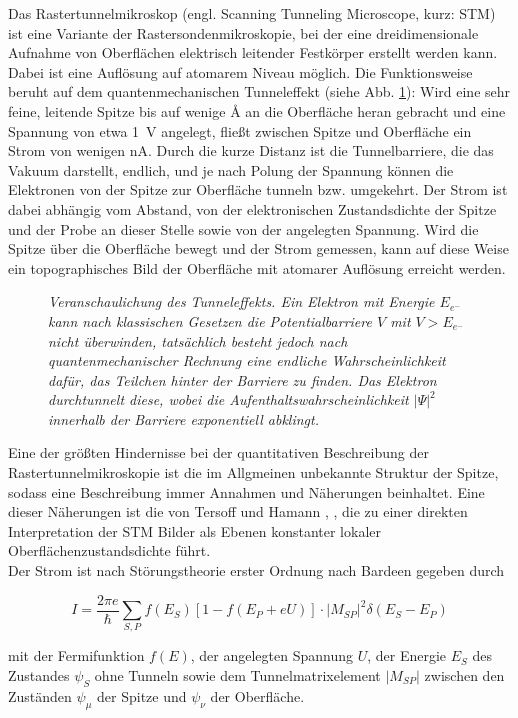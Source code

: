 Das Rastertunnelmikroskop (engl. Scanning Tunneling Microscope, kurz: STM) ist eine Variante der
Rastersondenmikroskopie, bei der eine dreidimensionale Aufnahme von Oberflächen elektrisch
leitender Festkörper erstellt werden kann. Dabei ist eine Auflösung auf atomarem Niveau möglich. Die
Funktionsweise beruht auf dem quantenmechanischen Tunneleffekt (siehe Abb. \ref{tunnel}): Wird eine
sehr feine, leitende Spitze bis auf wenige {\AA} an die Oberfläche heran gebracht und eine Spannung
von etwa \SI{1}{V} angelegt, fließt zwischen Spitze und Oberfläche ein Strom von wenigen nA. Durch
die kurze Distanz ist die Tunnelbarriere, die das Vakuum darstellt, endlich, und je nach Polung der Spannung können
die Elektronen von der Spitze zur Oberfläche tunneln bzw.
umgekehrt. Der Strom ist dabei abhängig vom Abstand, von der elektronischen Zustandsdichte der
Spitze und der Probe an dieser Stelle sowie von der angelegten Spannung. Wird die Spitze
über die Oberfläche bewegt und der Strom gemessen, kann auf diese Weise ein topographisches Bild der
Oberfläche mit atomarer Auflösung erreicht werden. 

\begin{figure}[H]
\centering
\sffamily 

\caption{\textit{Veranschaulichung des Tunneleffekts. Ein Elektron mit Energie $E_{e^-}$ kann nach
klassischen Gesetzen die Potentialbarriere $V$ mit $V>E_{e^-}$ nicht überwinden, tatsächlich besteht
jedoch nach quantenmechanischer Rechnung eine endliche Wahrscheinlichkeit dafür, das Teilchen
hinter der Barriere zu finden. Das Elektron durchtunnelt diese, wobei die
Aufenthaltswahrscheinlichkeit $|\Psi|^2$ innerhalb der Barriere exponentiell abklingt. }}
\label{tunnel}
\end{figure}


Eine der größten Hindernisse bei der quantitativen Beschreibung der Rastertunnelmikroskopie ist die
im Allgmeinen unbekannte Struktur der Spitze, sodass eine Beschreibung immer Annahmen und Näherungen
beinhaltet. Eine dieser Näherungen ist die von Tersoff und Hamann \cite{Ter83}, \cite{Ter85}, die
zu einer direkten Interpretation der STM Bilder als Ebenen konstanter lokaler
Oberflächenzustandsdichte führt.\\
Der Strom ist nach Störungstheorie erster Ordnung nach Bardeen \cite{Bar} gegeben durch

\[I=\frac{2\pi e}{\hbar}\sum_{S,P}
f(E_{S})[1-f(E_{P}+eU)]\cdot|M_{SP}|^2\delta(E_{S}-E_{P})\]

mit der Fermifunktion $f(E)$, der angelegten Spannung $U$, der Energie
$E_{S}$ des Zustandes $\psi_{S}$ ohne Tunneln sowie dem Tunnelmatrixelement $|M_{SP}|$
zwischen den Zuständen $\psi_{\mu}$ der Spitze und $\psi_{\nu}$ der Oberfläche.

